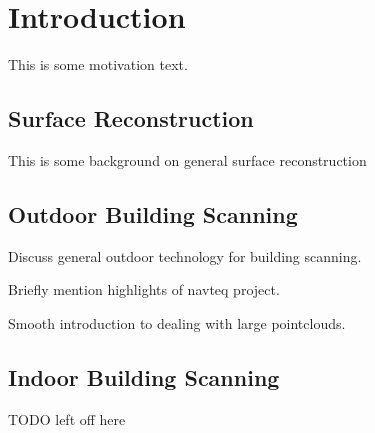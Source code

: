 \documentclass[10pt,onecolumn,oneside]{book}
\begin{document}
\tableofcontents{}
\listoffigures{}
\listoftables{}




\newpage
{}
\setcounter{page}{1}

\chapter{Introduction}
\label{ch:introduction}

This is some motivation text.

\section{Surface Reconstruction}
\label{sec:surf_recon_background}

This is some background on general surface reconstruction

\section{Outdoor Building Scanning}
\label{sec:outdoor_scanning}

Discuss general outdoor technology for building scanning.

Briefly mention highlights of navteq project.

Smooth introduction to dealing with large pointclouds.

\section{Indoor Building Scanning}
\label{sec:indoor_scanning}

TODO left off here


%

\vfill

\end{document}

